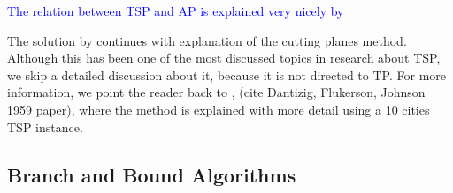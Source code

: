 \documentclass{mprop}
\theoremstyle{definition}
\begin{document}
\textcolor{blue}{The relation between TSP and AP is explained very nicely by \citet{Flood56}}



The solution by \citet{Dantzig54} continues with explanation of the cutting planes method. Although this has been one of the most discussed topics in research about TSP, we skip a detailed discussion about it, because it is not directed to TP. For more information, we point the reader back to \citep{Dantzig54}, (cite Dantizig, Flukerson, Johnson 1959 paper), where the method is explained with more detail using a 10 cities TSP instance.



\subsection{Branch and Bound Algorithms}
\label{branchandbound}
\end{document}

